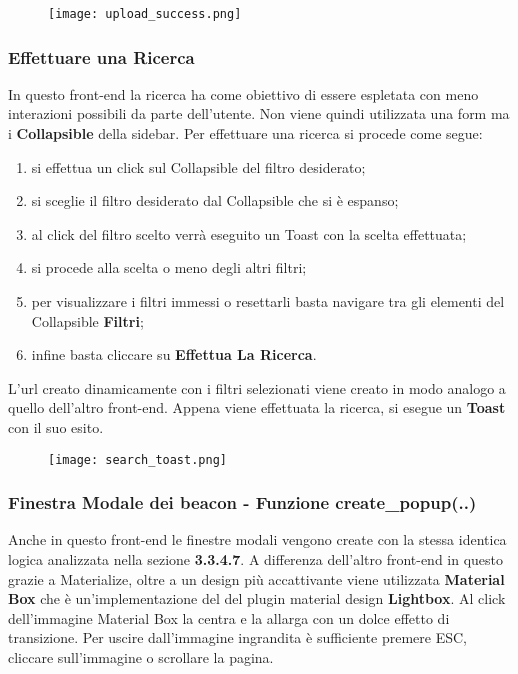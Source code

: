 \begin{figure}[h]
	\centering
	\label{fig:upload_success}
	\texttt{[image: upload\_success.png]}
\end{figure} 

\subsubsection{Effettuare una Ricerca}
In questo front-end la ricerca ha come obiettivo di essere espletata con meno interazioni possibili da parte dell'utente. Non viene quindi utilizzata una form ma i \textbf{Collapsible} della sidebar.\newline
Per effettuare una ricerca si procede come segue:
\begin{enumerate}
\item si effettua un click sul Collapsible del filtro desiderato;
\item si sceglie il filtro desiderato dal Collapsible che si è espanso;
\item al click del filtro scelto verrà eseguito un Toast con la scelta effettuata;
\item si procede alla scelta o meno degli altri filtri;
\item per visualizzare i filtri immessi o resettarli basta navigare tra gli elementi del Collapsible \textbf{Filtri};
\item infine basta cliccare su \textbf{Effettua La Ricerca}.
\end{enumerate}
L'url creato dinamicamente con i filtri selezionati viene creato in modo analogo a quello dell'altro front-end.
Appena viene effettuata la ricerca, si esegue un \textbf{Toast} con il suo esito.

\begin{figure}[h]
	\centering
	\label{fig:search_toast}
	\texttt{[image: search\_toast.png]}
\end{figure} 

\subsubsection{Finestra Modale dei beacon - Funzione create\_popup(..)}
Anche in questo front-end le finestre modali vengono create con la stessa identica logica analizzata nella sezione \textbf{3.3.4.7}. A differenza dell'altro front-end in questo grazie a Materialize, oltre a un design più accattivante viene utilizzata \textbf{Material Box} che è un'implementazione del del plugin material design \textbf{Lightbox}. Al click dell'immagine Material Box la centra e la allarga con un dolce effetto di transizione. Per uscire dall'immagine ingrandita è sufficiente premere ESC, cliccare sull'immagine o scrollare la pagina.


